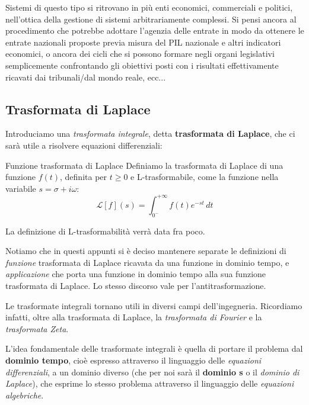 \documentclass[a4paper,11pt]{article}
\begin{document}
\begin{itemize}
		Sistemi di questo tipo si ritrovano in più enti economici, commerciali e politici, nell'ottica della gestione di sistemi arbitrariamente complessi. Si pensi ancora al procedimento che potrebbe adottare l'agenzia delle entrate in modo da ottenere le entrate nazionali proposte previa misura del PIL nazionale e altri indicatori economici, o ancora dei cicli che si possono formare negli organi legislativi semplicemente confrontando gli obiettivi posti con i risultati effettivamente ricavati dai tribunali/dal mondo reale, ecc...
\end{itemize}

\subsection{Trasformata di Laplace}
Introduciamo una \textit{trasformata integrale}, detta \textbf{trasformata di Laplace}, che ci sarà utile a risolvere equazioni differenziali:
\begin{definition}{Funzione trasformata di Laplace}
	Definiamo la trasformata di Laplace di una funzione $f(t)$, definita per $t \geq 0$ e L-trasformabile, come la funzione nella variabile $s = \sigma + i \omega$:
	$$
	\mathcal{L} [f] (s) = \int_{0^-}^{+\infty} f(t) e^{-st} \, dt
	$$
\end{definition}

La definizione di L-trasformabilità verrà data fra poco.

\par\smallskip

Notiamo  che in questi appunti si è deciso mantenere separate le definizioni di \textit{funzione} trasformata di Laplace ricavata da una funzione in dominio tempo, e \textit{applicazione} che porta una funzione in dominio tempo alla sua funzione trasformata di Laplace. Lo stesso discorso vale per l'antitrasformazione.

\par\smallskip

Le trasformate integrali tornano utili in diversi campi dell'ingegneria.
Ricordiamo infatti, oltre alla trasformata di Laplace, la \textit{trasformata di Fourier} e la \textit{trasformata Zeta}.

L'idea fondamentale delle trasformate integrali è quella di portare il problema dal \textbf{dominio tempo}, cioè espresso attraverso il linguaggio delle \textit{equazioni differenziali}, a un dominio diverso (che per noi sarà il \textbf{dominio s} o il \textit{dominio di Laplace}), che esprime lo stesso problema attraverso il linguaggio delle \textit{equazioni algebriche}.
\end{document}
